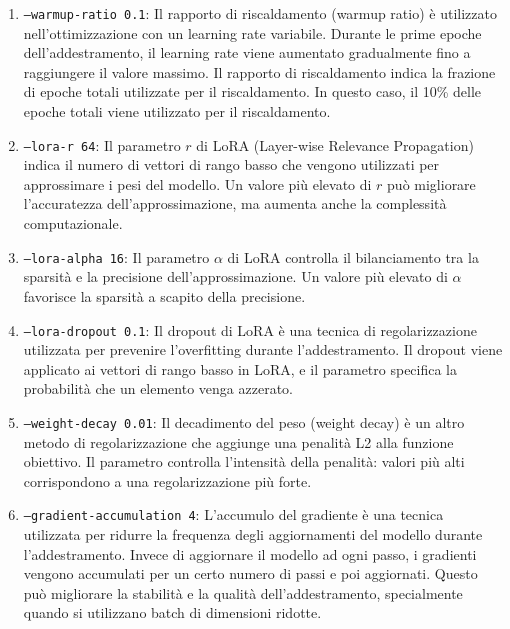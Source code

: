 \begin{enumerate}[label=\alph*.]

  \item \texttt{--warmup-ratio 0.1}: Il rapporto di riscaldamento (warmup ratio) è utilizzato nell'ottimizzazione con un learning rate variabile. Durante le prime epoche dell'addestramento, il learning rate viene aumentato gradualmente fino a raggiungere il valore massimo. Il rapporto di riscaldamento indica la frazione di epoche totali utilizzate per il riscaldamento. In questo caso, il 10\% delle epoche totali viene utilizzato per il riscaldamento.
  
  \item \texttt{--lora-r 64}: Il parametro $r$ di LoRA (Layer-wise Relevance Propagation) indica il numero di vettori di rango basso che vengono utilizzati per approssimare i pesi del modello. Un valore più elevato di $r$ può migliorare l'accuratezza dell'approssimazione, ma aumenta anche la complessità computazionale. 
  
  \item \texttt{--lora-alpha 16}: Il parametro $\alpha$ di LoRA controlla il bilanciamento tra la sparsità e la precisione dell'approssimazione. Un valore più elevato di $\alpha$ favorisce la sparsità a scapito della precisione. 
  
  \item \texttt{--lora-dropout 0.1}: Il dropout di LoRA è una tecnica di regolarizzazione utilizzata per prevenire l'overfitting durante l'addestramento. Il dropout viene applicato ai vettori di rango basso in LoRA, e il parametro specifica la probabilità che un elemento venga azzerato. 
  
  \item \texttt{--weight-decay 0.01}: Il decadimento del peso (weight decay) è un altro metodo di regolarizzazione che aggiunge una penalità L2 alla funzione obiettivo. Il parametro controlla l'intensità della penalità: valori più alti corrispondono a una regolarizzazione più forte. 
  
  \item \texttt{--gradient-accumulation 4}: L'accumulo del gradiente è una tecnica utilizzata per ridurre la frequenza degli aggiornamenti del modello durante l'addestramento. Invece di aggiornare il modello ad ogni passo, i gradienti vengono accumulati per un certo numero di passi e poi aggiornati. Questo può migliorare la stabilità e la qualità dell'addestramento, specialmente quando si utilizzano batch di dimensioni ridotte. 
  

\end{enumerate}
